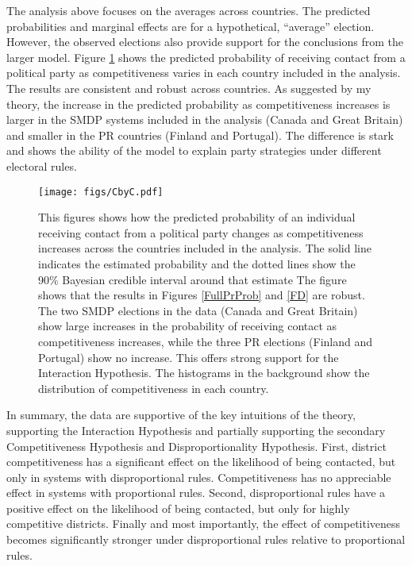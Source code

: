 \documentclass[12pt]{article}
\begin{document}
The analysis above focuses on the averages across countries. The predicted probabilities and marginal effects are for a hypothetical, ``average'' election. However, the observed elections also provide support for the conclusions from the larger model. Figure \ref{fig:CbyC} shows the predicted probability of receiving contact from a political party as competitiveness varies in each country included in the analysis. The results are consistent and robust across countries. As suggested by my theory, the increase in the predicted probability as competitiveness increases is larger in the SMDP systems included in the analysis (Canada and Great Britain) and smaller in the PR countries (Finland and Portugal). The difference is stark and shows the ability of the model to explain party strategies under different electoral rules.

\begin{figure}[h]
\centering
\texttt{[image: figs/CbyC.pdf]}
\caption{This figures shows how the predicted probability of an individual receiving contact from a political party changes as competitiveness increases across the countries included in the analysis. The solid line indicates the estimated probability and the dotted lines show the 90\% Bayesian credible interval around that estimate The figure shows that the results in Figures \ref{FullPrProb} and \ref{FD} are robust. The two SMDP elections in the data (Canada and Great Britain) show large increases in the probability of receiving contact as competitiveness increases, while the three PR elections (Finland and Portugal) show no increase. This offers strong support for the Interaction Hypothesis. The histograms in the background show the distribution of competitiveness in each country.}\label{fig:CbyC}
\end{figure}

In summary, the data are supportive of the key intuitions of the theory, supporting the Interaction Hypothesis and partially supporting the secondary Competitiveness Hypothesis and Disproportionality Hypothesis. First, district competitiveness has a significant effect on the likelihood of being contacted, but only in systems with disproportional rules. Competitiveness has no appreciable effect in systems with proportional rules. Second, disproportional rules have a positive effect on the likelihood of being contacted, but only for highly competitive districts. Finally and most importantly, the effect of competitiveness becomes significantly stronger under disproportional rules relative to proportional rules.
\end{document}
